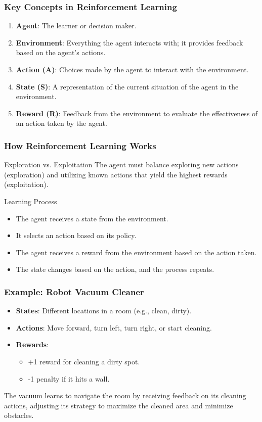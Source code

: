 \documentclass[aspectratio=169]{beamer}
\begin{document}
\begin{frame}[fragile]
    \frametitle{Key Concepts in Reinforcement Learning}
    \begin{enumerate}
        \item \textbf{Agent}: The learner or decision maker.
        \item \textbf{Environment}: Everything the agent interacts with; it provides feedback based on the agent's actions.
        \item \textbf{Action (A)}: Choices made by the agent to interact with the environment.
        \item \textbf{State (S)}: A representation of the current situation of the agent in the environment.
        \item \textbf{Reward (R)}: Feedback from the environment to evaluate the effectiveness of an action taken by the agent.
    \end{enumerate}
\end{frame}

\begin{frame}[fragile]
    \frametitle{How Reinforcement Learning Works}
    \begin{block}{Exploration vs. Exploitation}
        The agent must balance exploring new actions (exploration) and utilizing known actions that yield the highest rewards (exploitation).
    \end{block}
    \begin{block}{Learning Process}
        \begin{itemize}
            \item The agent receives a state from the environment.
            \item It selects an action based on its policy.
            \item The agent receives a reward from the environment based on the action taken.
            \item The state changes based on the action, and the process repeats.
        \end{itemize}
    \end{block}
\end{frame}

\begin{frame}[fragile]
    \frametitle{Example: Robot Vacuum Cleaner}
    \begin{itemize}
        \item \textbf{States}: Different locations in a room (e.g., clean, dirty).
        \item \textbf{Actions}: Move forward, turn left, turn right, or start cleaning.
        \item \textbf{Rewards}:
            \begin{itemize}
                \item +1 reward for cleaning a dirty spot.
                \item -1 penalty if it hits a wall.
            \end{itemize}
    \end{itemize}
    The vacuum learns to navigate the room by receiving feedback on its cleaning actions, adjusting its strategy to maximize the cleaned area and minimize obstacles.
\end{frame}
\end{document}
